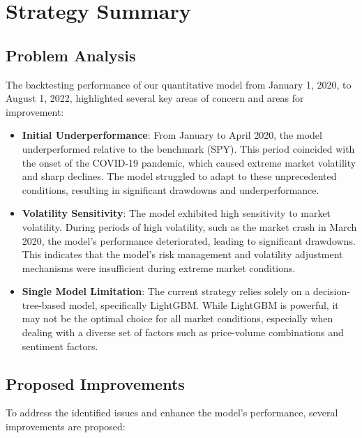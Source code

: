 \documentclass[conference]{IEEEtran}
\begin{document}
\section{\textbf{Strategy Summary}}

\subsection{\textbf{Problem Analysis}}

The backtesting performance of our quantitative model from January 1, 2020, to August 1, 2022, highlighted several key areas of concern and areas for improvement:

\begin{itemize}
    \item \textbf{Initial Underperformance}: From January to April 2020, the model underperformed relative to the benchmark (SPY). This period coincided with the onset of the COVID-19 pandemic, which caused extreme market volatility and sharp declines. The model struggled to adapt to these unprecedented conditions, resulting in significant drawdowns and underperformance.
    \item \textbf{Volatility Sensitivity}: The model exhibited high sensitivity to market volatility. During periods of high volatility, such as the market crash in March 2020, the model's performance deteriorated, leading to significant drawdowns. This indicates that the model's risk management and volatility adjustment mechanisms were insufficient during extreme market conditions.
    \item \textbf{Single Model Limitation}: The current strategy relies solely on a decision-tree-based model, specifically LightGBM. While LightGBM is powerful, it may not be the optimal choice for all market conditions, especially when dealing with a diverse set of factors such as price-volume combinations and sentiment factors.
\end{itemize}

\subsection{\textbf{Proposed Improvements}}

To address the identified issues and enhance the model's performance, several improvements are proposed:
\end{document}
